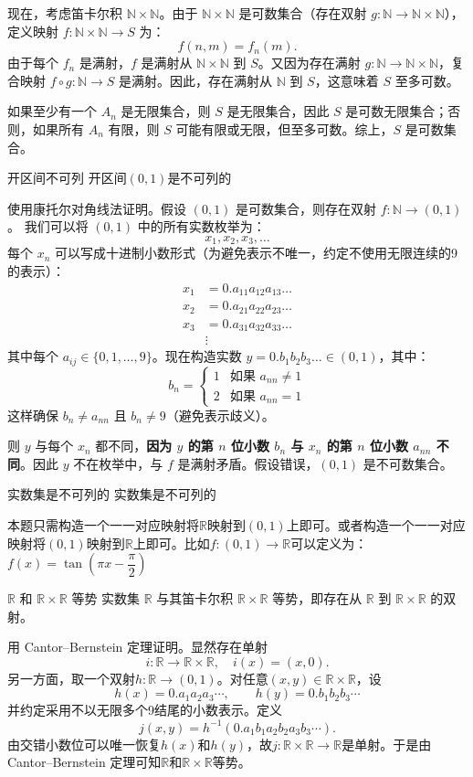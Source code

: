 现在，考虑笛卡尔积 $\mathbb{N} \times \mathbb{N}$。由于 $\mathbb{N} \times \mathbb{N}$ 是可数集合（存在双射 $g: \mathbb{N} \to \mathbb{N} \times \mathbb{N}$），定义映射 $f: \mathbb{N} \times \mathbb{N} \to S$ 为：
\[
f(n, m) = f_n(m).
\]
由于每个 $f_n$ 是满射，$f$ 是满射从 $\mathbb{N} \times \mathbb{N}$ 到 $S$。又因为存在满射 $g: \mathbb{N} \to \mathbb{N} \times \mathbb{N}$，复合映射 $f \circ g: \mathbb{N} \to S$ 是满射。因此，存在满射从 $\mathbb{N}$ 到 $S$，这意味着 $S$ 至多可数。

如果至少有一个 $A_n$ 是无限集合，则 $S$ 是无限集合，因此 $S$ 是可数无限集合；否则，如果所有 $A_n$ 有限，则 $S$ 可能有限或无限，但至多可数。综上，$S$ 是可数集合。
\begin{theorem}{开区间不可列}{}
    开区间$(0,1)$是不可列的
\end{theorem}
使用康托尔对角线法证明。假设 $(0,1)$ 是可数集合，则存在双射 $f: \mathbb{N} \to (0,1)$。
我们可以将 $(0,1)$ 中的所有实数枚举为：
\[
x_1, x_2, x_3, \dots
\]
每个 $x_n$ 可以写成十进制小数形式（为避免表示不唯一，约定不使用无限连续的9的表示）：
\[
\begin{aligned}
x_1 &= 0.a_{11}a_{12}a_{13}\dots \\
x_2 &= 0.a_{21}a_{22}a_{23}\dots \\
x_3 &= 0.a_{31}a_{32}a_{33}\dots \\
&\vdots
\end{aligned}
\]
其中每个 $a_{ij} \in \{0,1,\dots,9\}$。现在构造实数 $y = 0.b_1b_2b_3\dots \in (0,1)$，其中：
\[
b_n = 
\begin{cases}
1 & \text{如果 } a_{nn} \neq 1 \\
2 & \text{如果 } a_{nn} = 1
\end{cases}
\]
这样确保 $b_n \neq a_{nn}$ 且 $b_n \neq 9$（避免表示歧义）。

则 $y$ 与每个 $x_n$ 都不同，\textbf{因为 $y$ 的第 $n$ 位小数 $b_n$ 与 $x_n$ 的第 $n$ 位小数 $a_{nn}$ 不同}。因此 $y$ 不在枚举中，与 $f$ 是满射矛盾。假设错误，$(0,1)$ 是不可数集合。
\begin{theorem}{实数集是不可列的}{}
实数集是不可列的
\end{theorem}
本题只需构造一个一一对应映射将$\mathbb{R}$映射到$(0,1)$上即可。或者构造一个一一对应映射将$(0,1)$映射到$\mathbb{R}$上即可。比如$f: (0,1) \to \mathbb{R}$可以定义为：$f(x)=\tan\left(\pi x-\dfrac{\pi}{2}\right)$
\begin{theorem}{$\mathbb{R}$ 和 $\mathbb{R} \times \mathbb{R}$ 等势}{}
    实数集 $\mathbb{R}$ 与其笛卡尔积 $\mathbb{R} \times \mathbb{R}$ 等势，即存在从 $\mathbb{R}$ 到 $\mathbb{R} \times \mathbb{R}$ 的双射。
\end{theorem}
用 Cantor--Bernstein 定理证明。显然存在单射
\[
i:\mathbb{R}\to\mathbb{R}\times\mathbb{R},\quad i(x)=(x,0).
\]
另一方面，取一个双射$h:\mathbb{R}\to(0,1)$。对任意$(x,y)\in\mathbb{R}\times\mathbb{R}$，设
\[
h(x)=0.a_1a_2a_3\cdots,\qquad h(y)=0.b_1b_2b_3\cdots
\]
并约定采用不以无限多个9结尾的小数表示。定义
\[
j(x,y)=h^{-1}(0.a_1b_1a_2b_2a_3b_3\cdots).
\]
由交错小数位可以唯一恢复$h(x)$和$h(y)$，故$j:\mathbb{R}\times\mathbb{R}\to\mathbb{R}$是单射。于是由 Cantor--Bernstein 定理可知$\mathbb{R}$和$\mathbb{R}\times\mathbb{R}$等势。
